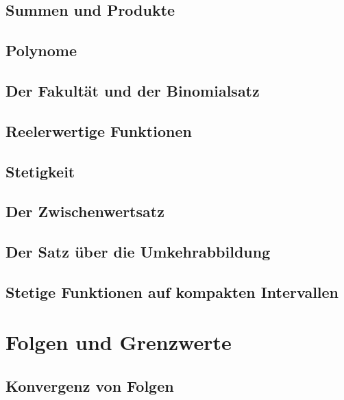 \documentclass[12pt, twoside, openright]{report}
\theoremstyle{definition} %
\theoremstyle{definition} %
\theoremstyle{definition} %
\theoremstyle{definition} %
\theoremstyle{definition} %
\theoremstyle{remark} %
\begin{document}
		\section{Summen und Produkte}
		
		
		\section{Polynome}
		
		
		\section{Der Fakultät und der Binomialsatz}
		
		
		\section{Reelerwertige Funktionen}
		
		
		\section{Stetigkeit}
		
		
		\section{Der Zwischenwertsatz}
		
	
		\section{Der Satz über die Umkehrabbildung}
		
		
		\section{Stetige Funktionen auf kompakten Intervallen}
		
		
	\chapter{Folgen und Grenzwerte}
		\section{Konvergenz von Folgen}
		
		
\end{document}
